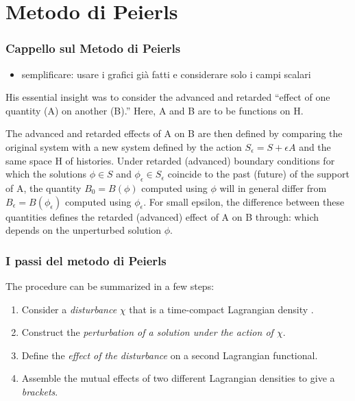 \documentclass{beamer}
\begin{document}
	\section{Metodo di Peierls}
	\frame{\sectionpage}
	
	\begin{frame}
		\frametitle{Cappello sul Metodo di Peierls }
			\begin{itemize}
				\item semplificare: usare i grafici già fatti e considerare solo i campi scalari
			\end{itemize}
			His essential insight was to consider the advanced and retarded “effect of one quantity (A) on another (B).” Here, A and B are to
be functions on H. 

			The advanced  and retarded  effects of A on B are then defined by comparing the original system with a new system defined by the action $S_\epsilon = S + \epsilon A$ and the same space H of histories. 
			Under retarded (advanced) boundary conditions for which the solutions $\phi \in S$ and $\phi_\epsilon	\in S_\epsilon$ coincide to the past (future) of the support of A, the quantity $B_0 = B(\phi)$ computed using $\phi$ will in general differ from $B_\epsilon = B(\phi_\epsilon)$ computed using $\phi_\epsilon$.
			For small epsilon, the difference between these quantities defines the retarded (advanced) effect of A on B through:
which depends on the unperturbed solution $\phi$.
	\end{frame}
	
	\begin{frame}
		\frametitle{I passi del metodo di Peierls}
		The procedure can be summarized in a few steps:
		\begin{enumerate}
			\item Consider a \emph{disturbance} $\chi$ that is a time-compact Lagrangian density .
			\item Construct the \emph{perturbation of a solution under the action of $\chi$}.
			\item Define the \emph{effect of the disturbance} on a second Lagrangian functional.
			\item Assemble the mutual effects of two different Lagrangian densities to give a \emph{brackets}.
		\end{enumerate}	
	\end{frame}
	
\end{document}
